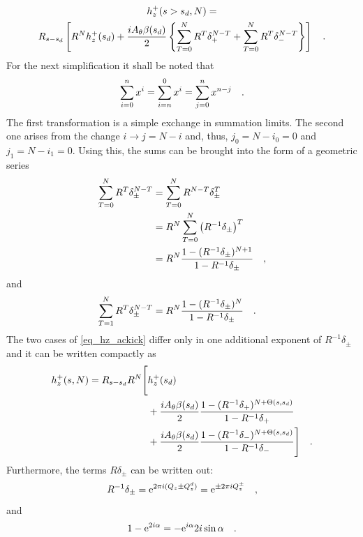 %
\begin{multline}
    h_z^+(s>s_d, N) = \\
    R_{s-s_d}\left[
        R^N h_z^+(s_d) +
        \frac{iA_\theta\beta(s_d)}{2}\left\{
            \sum\limits_{T=0}^N R^T \delta_+^{N-T}
            + \sum\limits_{T=0}^N R^T \delta_-^{N-T}
        \right\}
        \right]
    \quad .
\end{multline}
%
For the next simplification it shall be noted that
%
\begin{equation}
    \sum\limits_{i=0}^n x^i = \sum\limits_{i=n}^0 x^i = \sum\limits_{j=0}^{n} x^{n-j}
    \quad .
\end{equation}
%
The first transformation is a simple exchange in summation limits. The second one arises from the
change $i\rightarrow j=N-i$ and, thus, $j_0 = N-i_0 = 0$ and $j_1 = N - i_1 = 0$.
Using this, the sums can be brought into the form of a geometric series
%
\begin{align}
    \sum\limits_{T=0}^N R^T\delta_\pm^{N-T}
    &= \sum\limits_{T=0}^N R^{N-T}\delta_\pm^{T} \notag \\
    &=  R ^N \sum\limits_{T=0}^N \left( R^{-1}\delta_\pm \right)^{T} \notag \\
    &=  R ^N \frac{1- (R^{-1}\delta_\pm)^{N+1}}{1 - R^{-1}\delta_\pm}
    \quad ,
\end{align}
%
and
%
\begin{align}
    \sum\limits_{T=1}^N R^T\delta_\pm^{N-T}
    &= R^N \frac{1- (R^{-1}\delta_\pm)^{N}}{1 - R^{-1}\delta_\pm}
    \quad .
\end{align}
%
The two cases of \eqref{eq_hz_ackick} differ only in one additional exponent of $R^{-1}\delta_\pm$
and it can be written compactly as
%
\begin{align}
    h_z^+(s, N) = R_{s-s_d}R^N 
    \Bigg[&h_z^+(s_d)  \notag \\
        &+ \frac{iA_\theta\beta(s_d)}{2}\frac{1-(R^{-1}\delta_+)^{N+\Theta(s,s_d)}}{1-R^{-1}\delta_+}  \notag \\
        &+ \frac{iA_\theta\beta(s_d)}{2}\frac{1-(R^{-1}\delta_-)^{N+\Theta(s,s_d)}}{1-R^{-1}\delta_-}
    \Bigg]
    \quad .
\end{align}
%
Furthermore, the terms $R\delta_\pm$ can be written out:
%
\begin{equation}
    R^{-1}\delta_\pm = \text{e}^{2\pi i (Q_z \pm Q^{d}_{z})} = \text{e}^{\pm 2\pi i Q_z^\pm}
    \quad ,
\end{equation}
%
and
%
\begin{equation}
    1 - \text{e}^{2i\alpha} = -\text{e}^{i\alpha}2i \sin\alpha
    \quad .
\end{equation}
